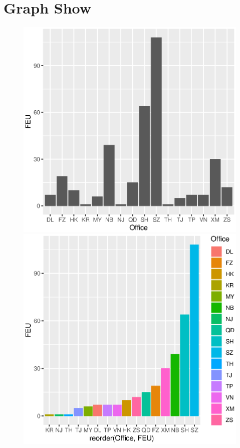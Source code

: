 \documentclass[a4paper]{article}
\begin{document}
	\section*{Graph Show}
		\begin{figure}
		\begin{center}
		\includegraphics{Rplot01}
		\includegraphics{Rplot03}
		\end{center}
		\end{figure}
\end{document}
